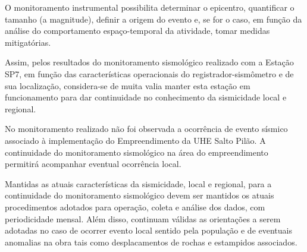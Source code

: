 \par{O monitoramento instrumental possibilita determinar o epicentro, quantificar o tamanho (a magnitude), definir a origem do evento e, se for o caso, em função da análise do comportamento espaço-temporal da atividade, tomar medidas mitigatórias.} 
\par{Assim, pelos resultados do monitoramento sismológico realizado com a Estação SP7, em função das características operacionais do registrador-sismômetro e de sua localização, considera-se de muita valia manter esta estação em funcionamento para dar continuidade no conhecimento da sismicidade local e regional.}
\par{No monitoramento realizado não foi observada a ocorrência de evento sísmico associado à implementação do Empreendimento da UHE Salto Pilão. A continuidade do monitoramento sismológico na área do empreendimento permitirá acompanhar eventual ocorrência local.}
\par{Mantidas as atuais características da sismicidade, local e regional, para a continuidade do monitoramento sismológico devem ser mantidos os atuais procedimentos adotados para operação, coleta e análise dos dados, com periodicidade mensal. Além disso, continuam válidas as orientações a serem adotadas no caso de ocorrer evento local sentido pela população e de eventuais anomalias na obra tais como desplacamentos de rochas e estampidos associados.}

